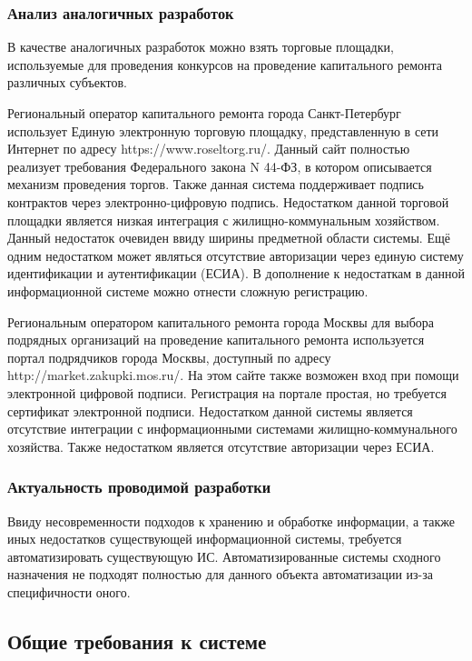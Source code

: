 \subsubsection{Анализ аналогичных разработок}

В качестве аналогичных разработок можно взять торговые площадки, используемые для проведения конкурсов на проведение капитального ремонта различных субъектов.

Региональный оператор капитального ремонта города Санкт-Петербург использует Единую электронную торговую площадку, представленную в сети Интернет по адресу https://www.roseltorg.ru/.
Данный сайт полностью реализует требования Федерального закона N 44-ФЗ, в котором описывается механизм проведения торгов.
Также данная система поддерживает подпись контрактов через электронно-цифровую подпись.
Недостатком данной торговой площадки является низкая интеграция с жилищно-коммунальным хозяйством.
Данный недостаток очевиден ввиду ширины предметной области системы.
Ещё одним недостатком может являться отсутствие авторизации через единую систему идентификации и аутентификации (ЕСИА).
В дополнение к недостаткам в данной информационной системе можно отнести сложную регистрацию.

Региональным оператором капитального ремонта города Москвы для выбора подрядных организаций на проведение капитального ремонта используется портал подрядчиков города Москвы, доступный по адресу http://market.zakupki.mos.ru/.
На этом сайте также возможен вход при помощи электронной цифровой подписи.
Регистрация на портале простая, но требуется сертификат электронной подписи.
Недостатком данной системы является отсутствие интеграции с информационными системами жилищно-коммунального хозяйства.
Также недостатком является отсутствие авторизации через ЕСИА.

\subsubsection{Актуальность проводимой разработки}

Ввиду несовременности подходов к хранению и обработке информации, а также иных недостатков существующей информационной системы, требуется автоматизировать существующую ИС.
Автоматизированные системы сходного назначения не подходят полностью для данного объекта автоматизации из-за специфичности оного.

\subsection{Общие требования к системе}

